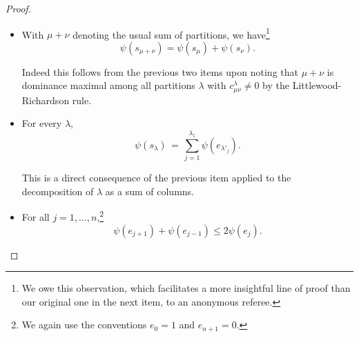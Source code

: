 \begin{proof}
\begin{itemize}
			To see this, we can assume without loss of generality that $\mu$ is obtained from $\nu$ by moving a single box from row $i$ down to row $j > i$, meaning that $\mu$ and $\nu$ coincide in all rows apart from
			\[
				\mu_i = \nu_i - 1, \qquad \mu_j = \nu_j + 1,
			\]
			and $j = i + 1$ (box moves down by one row and left by any number of columns) or $\mu_i = \mu_j$ (box moves left by one column and down any number of rows)~\cite[Proposition~2.3]{brylawski}.
			Then any way of adding at least $m \coloneqq \sum_{k < \nu_i} (n - \nu'_k)$ boxes to $\mu$ so as to obtain a new partition necessarily also adds the extra box at $(i, \nu_i)$.
			By repeated application of the Pieri rule, it follows that every Schur polynomial that occurs in the expansion of $s_\mu e_1^m$ also occurs in the expansion of $s_\nu e_1^m$.
			Applying $\psi$ to this statement gives
			\[
				\psi(s_\mu) + m \psi(e_1) \,\le\, \psi(s_\nu) + m \psi(e_1),
			\]
			and hence also the desired $\psi(s_\mu) \le \psi(s_\nu)$.
		\item With $\mu + \nu$ denoting the usual sum of partitions, we have\footnote{We owe this observation, which facilitates a more insightful line of proof than our original one in the next item, to an anonymous referee.}
			\[
				\psi(s_{\mu + \nu}) = \psi(s_\mu) + \psi(s_\nu).
			\]

			Indeed this follows from the previous two items upon noting that $\mu + \nu$ is dominance maximal among all partitions $\lambda$ with $c^{\lambda}_{\mu\nu} \neq 0$ by the Littlewood-Richardson rule.
		\item For every $\lambda$,
			\begin{equation}
				\label{psi_se}
				\psi(s_\lambda) \,=\, \sum_{j=1}^{\lambda_1} \psi(e_{\lambda'_j}).
			\end{equation}

			This is a direct consequence of the previous item applied to the decomposition of $\lambda$ as a sum of columns.
		\item For all $j = 1, \ldots, n$,\footnote{We again use the conventions $e_0 = 1$ and $e_{n+1} = 0$.}
			\begin{equation}
				\label{submod}
				\psi(e_{j+1}) + \psi(e_{j-1}) \le 2 \psi(e_j).
			\end{equation}
			

\end{itemize}
\end{proof}
